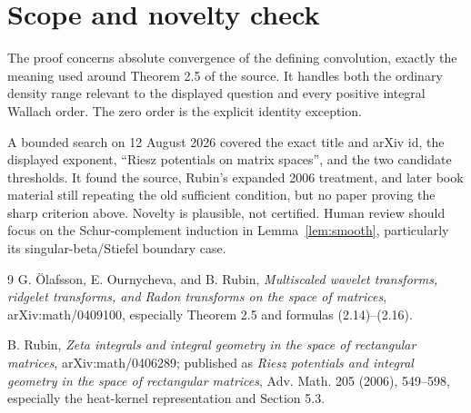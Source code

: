 \documentclass[11pt]{article}
\begin{document}
\section{Scope and novelty check}

The proof concerns absolute convergence of the defining convolution, exactly
the meaning used around Theorem 2.5 of the source.  It handles both the
ordinary density range relevant to the displayed question and every positive
integral Wallach order.  The zero order is the explicit identity exception.

A bounded search on 12 August 2026 covered the exact title and arXiv id,
the displayed exponent, ``Riesz potentials on matrix spaces'', and the two
candidate thresholds.  It found the source, Rubin's expanded 2006 treatment,
and later book material still repeating the old sufficient condition, but no
paper proving the sharp criterion above.  Novelty is plausible, not certified.
Human review should focus on the Schur-complement induction in
Lemma~\ref{lem:smooth}, particularly its singular-beta/Stiefel boundary case.

\begin{thebibliography}{9}
G. \"Olafsson, E. Ournycheva, and B. Rubin,
\emph{Multiscaled wavelet transforms, ridgelet transforms, and Radon
transforms on the space of matrices}, arXiv:math/0409100, especially
Theorem 2.5 and formulas (2.14)--(2.16).

B. Rubin,
\emph{Zeta integrals and integral geometry in the space of rectangular
matrices}, arXiv:math/0406289; published as
\emph{Riesz potentials and integral geometry in the space of rectangular
matrices}, Adv. Math. 205 (2006), 549--598, especially the heat-kernel
representation and Section 5.3.
\end{thebibliography}
\end{document}
